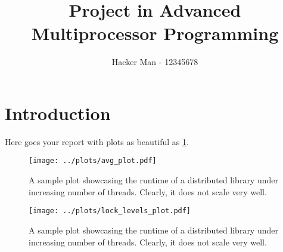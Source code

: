 \documentclass{article}
\begin{document}
\title{Project in Advanced Multiprocessor Programming}
\author{Hacker Man - 12345678}
\maketitle

\section{Introduction}

Here goes your report with plots as beautiful as \cref{fig:example_plot}.

\begin{figure}[ht!]
  \centering
  \texttt{[image: ../plots/avg\_plot.pdf]}
  \caption{A sample plot showcasing the runtime of a distributed library under
  increasing number of threads. Clearly, it does not scale very well.}
  \label{fig:example_plot}
\end{figure}

\begin{figure}[ht!]
  \centering
  \texttt{[image: ../plots/lock\_levels\_plot.pdf]}
  \caption{A sample plot showcasing the runtime of a distributed library under
  increasing number of threads. Clearly, it does not scale very well.}
  \label{fig:lock_levels}
\end{figure}
\end{document}
